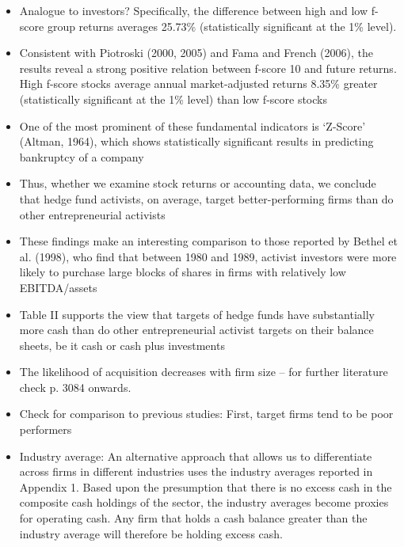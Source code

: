 \documentclass[12pt]{article}
\begin{document}
\begin{itemize}
        \item Analogue to investors? Specifically, the difference between high and low f-score group returns averages 25.73\% (statistically significant at the 1\% level). \citep{Choi2012}

        \item Consistent with Piotroski (2000, 2005) and Fama and French (2006), the results reveal a strong positive relation between f-score 10 and future returns. High f-score stocks average annual market-adjusted returns 8.35\% greater (statistically significant at the 1\% level) than low f-score stocks \citep{Choi2012} 

       \item One of the most prominent of these fundamental indicators is ‘Z-Score’ (Altman, 1964), which shows statistically significant results in predicting bankruptcy of a company \citep{Mohr2012}

       \item Thus, whether we examine stock returns or accounting data, we conclude that hedge fund activists, on average, target better-performing firms than do other entrepreneurial activists \citep{Klein2009}

       \item These findings make an interesting comparison to those reported by Bethel et al. (1998), who find that between 1980 and 1989, activist investors were more likely to purchase large blocks of shares in firms with relatively low EBITDA/assets \citep{Klein2009}

       \item Table II supports the view that targets of hedge funds have substantially more cash than do other entrepreneurial activist targets on their balance sheets, be it cash or cash plus investments \citep{Klein2009}

       \item The likelihood of acquisition decreases with firm size \citep{Akhigbe2007} -- for further literature check p. 3084 onwards.

       \item Check for comparison to previous studies: First, target firms tend to be poor performers \citep{Denes2017}

       \item Industry average: An alternative approach that allows us to differentiate across firms in different industries uses the industry averages reported in Appendix 1. Based upon the presumption that there is no excess cash in the composite cash holdings of the sector, the industry averages become proxies for operating cash. Any firm that holds a cash balance greater than the industry average will therefore be holding excess cash. \citep{Damodaran2005}


\end{itemize}
\end{document}
